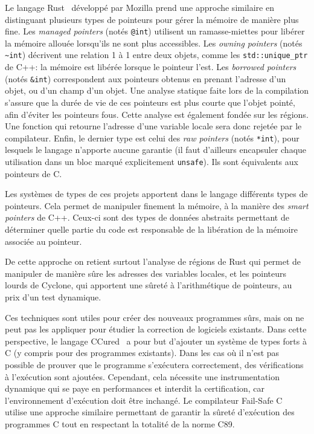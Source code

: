 
Le langage Rust~ développé par Mozilla prend une approche similaire
en distinguant plusieurs types de pointeurs pour gérer la mémoire de manière
plus fine. Les \emph{managed pointers} (notés \texttt{@int}) utilisent un
ramasse-miettes pour libérer la mémoire allouée lorsqu'ils ne sont plus
accessibles. Les \emph{owning pointers} (notés \texttt{\textasciitilde{}int})
décrivent une relation 1 à 1 entre deux objets, comme les
\texttt{std::unique\_ptr} de C++: la mémoire est libérée lorsque le pointeur
l'est. Les \emph{borrowed pointers} (notés \texttt{\&int}) correspondent aux
pointeurs obtenus en prenant l'adresse d'un objet, ou d'un champ d'un objet. Une
analyse statique faite lors de la compilation s'assure que la durée de vie de
ces pointeurs est plus courte que l'objet pointé, afin d'éviter les pointeurs
fous. Cette analyse est également fondée sur les régions. Une fonction qui
retourne l'adresse d'une variable locale sera donc rejetée par le compilateur.
Enfin, le dernier type est celui des \emph{raw pointers} (notés \texttt{*int}),
pour lesquels le langage n'apporte aucune garantie (il faut d'ailleurs
encapsuler chaque utilisation dans un bloc marqué explicitement
\texttt{unsafe}). Ils sont équivalents aux pointeurs de C.

Les systèmes de types de ces projets apportent dans le langage différents types
de pointeurs. Cela permet de manipuler finement la mémoire, à la manière des
\emph{smart pointers} de C++. Ceux-ci sont des types de données abstraits
permettant de déterminer quelle partie du code est responsable de la libération
de la mémoire associée au pointeur.

De cette approche on retient surtout l'analyse de régions de Rust qui permet de
manipuler de manière sûre les adresses des variables locales, et les pointeurs
lourds de Cyclone, qui apportent une sûreté à l'arithmétique de pointeurs, au
prix d'un test dynamique.

Ces techniques sont utiles pour créer des nouveaux programmes sûrs, mais on ne
peut pas les appliquer pour étudier la correction de logiciels existants. Dans
cette perspective, le langage CCured~\cite{ccured-toplas} a pour but d'ajouter
un système de types forts à C (y compris pour des programmes existants). Dans
les cas où il n'est pas possible de prouver que le programme s'exécutera
correctement, des vérifications à l'exécution sont ajoutées. Cependant, cela
nécessite une instrumentation dynamique qui se paye en performances et interdit
la certification, car l'environnement d'exécution doit être inchangé. Le
compilateur Fail-Safe C~\cite{oiwa09}  utilise une approche
similaire permettant de garantir la sûreté d'exécution des programmes C tout en
respectant la totalité de la norme C89.

